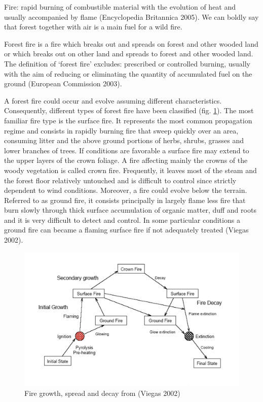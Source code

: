 {{	Fire: rapid burning of combustible material with the evolution of heat and usually accompanied by flame (Encyclopedia Britannica 2005). We can boldly say that forest together with air is a main fuel for a wild fire.
	
	Forest fire is a fire which breaks out and spreads on forest and other wooded land or which breaks out on other land and spreads to forest and other wooded land. The definition of ‘forest fire’ excludes: prescribed or controlled burning, usually with the aim of reducing or eliminating the quantity of accumulated fuel on the ground (European Commission 2003).
	
	A forest fire could occur and evolve assuming different characteristics. Consequently, different types of forest fire have been classified (fig. \ref{fig:fire_types}). The most familiar fire type is the surface fire. It represents the most common propagation regime and consists in rapidly burning fire that sweep quickly over an area, consuming litter and the above ground portions of herbs, shrubs, grasses and lower branches of trees. If conditions are favorable a surface fire may extend to the upper layers of the crown foliage. A fire affecting mainly the crowns of the woody vegetation is called crown fire. Frequently, it leaves most of the steam and the forest floor relatively untouched and is difficult to control since strictly dependent to wind conditions. Moreover, a fire could evolve below the terrain. Referred to as ground fire, it consists principally in largely flame less fire that burn slowly through thick surface accumulation of organic matter, duff and roots and it is very difficult to detect and control. In some particular conditions a ground fire can became a flaming surface fire if not adequately treated (Viegas 2002).

	\begin{figure}[H]
		\centering
		\includegraphics[width=0.9\linewidth]{images/fire_types.png}
		\caption{Fire growth, spread and decay from (Viegas 2002)}
		\label{fig:fire_types}
	\end{figure}

}}
